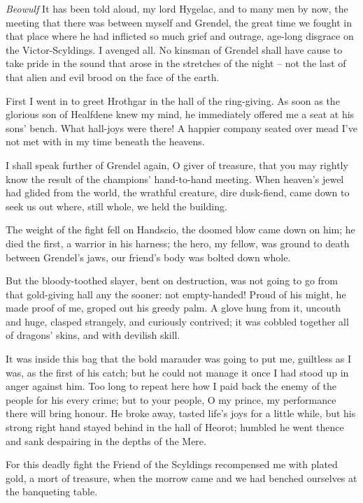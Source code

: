 \documentclass[a4paper]{article}
\begin{document}
{\textit{Beowulf} It has been told aloud, my lord Hygelac,
and to many men by now, the meeting that there was
between myself and Grendel, the great time
we fought in that place where he had inflicted so much
grief and outrage, age-long disgrace
on the Victor-Scyldings. I avenged all.
No kinsman of Grendel shall have cause to take pride
in the sound that arose in the stretches of the night
– not the last of that alien and evil brood
on the face of the earth.

First I went in
to greet Hrothgar in the hall of the ring-giving.
As soon as the glorious son of Healfdene
knew my mind, he immediately
offered me a seat at his sons’ bench.
What hall-joys were there! A happier company
seated over mead I’ve not met with in my time
beneath the heavens. 

I shall speak further
of Grendel again, O giver of treasure,
that you may rightly know the result of the champions’
hand-to-hand meeting. When heaven’s jewel
had glided from the world, the wrathful creature,
dire dusk-fiend, came down to seek us out
where, still whole, we held the building.

The weight of the fight fell on Handscio,
the doomed blow came down on him; he died the first,
a warrior in his harness; the hero, my fellow,
was ground to death between Grendel’s jaws,
our friend’s body was bolted down whole.

But the bloody-toothed slayer, bent on destruction,
was not going to go from that gold-giving hall
any the sooner: not empty-handed!
Proud of his might, he made proof of me,
groped out his greedy palm. A glove hung from it,
uncouth and huge, clasped strangely,
and curiously contrived; it was cobbled together
all of dragons’ skins, and with devilish skill.

It was inside this bag that the bold marauder
was going to put me, guiltless as I was,
as the first of his catch; but he could not manage it
once I had stood up in anger against him.
Too long to repeat here how I paid back
the enemy of the people for his every crime;
but to your people, O my prince, my performance there
will bring honour. He broke away,
tasted life’s joys for a little while,
but his strong right hand stayed behind
in the hall of Heorot; humbled he went thence
and sank despairing in the depths of the Mere.

For this deadly fight the Friend of the Scyldings
recompensed me with plated gold,
a mort of treasure, when the morrow came
and we had benched ourselves at the banqueting table.

}
\end{document}

